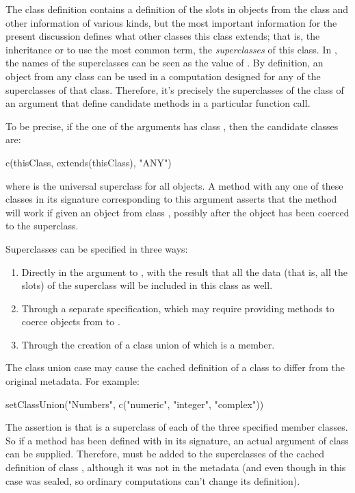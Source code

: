\documentclass[11pt]{article}
\begin{document}
The class definition contains a definition of the slots in objects from the class and other information of various kinds, but the most important information for the present discussion defines what other classes this class extends; that is, the inheritance or to use the most common term, the \emph{superclasses} of this class.
In \R{}, the names of the superclasses can be seen as the value of  .
By definition, an object from any class can be used in a computation designed for any of the superclasses of that class.
Therefore, it's precisely the superclasses of the class of an argument that define candidate methods in a particular function call.

To be precise, if the one of the arguments has class , then the candidate classes are:
\begin{Example}
c(thisClass, extends(thisClass), "ANY")
\end{Example}
where  is the universal superclass for all objects.
A method with any one of these classes in its signature  corresponding to this argument asserts that the method will work if given an object from class , possibly after the object has been coerced to the superclass.

Superclasses can be specified in three ways:
\begin{enumerate}
\item Directly in the  argument to , with the result that all the data (that is, all the slots) of the superclass will be included in this class as well.
\item  Through a separate  specification, which may require providing methods to coerce objects from  to .
\item Through the creation of a class union of which  is a member.
\end{enumerate}
The class union case may cause the cached definition of a class to differ from the original metadata.
For example:
\begin{Example}
setClassUnion("Numbers", c("numeric", "integer", "complex"))
\end{Example}
The assertion is that  is a superclass of each of the three specified member classes.
So if a method has been defined with  in its signature, an actual argument of class  can be supplied.
Therefore,  must be added to the superclasses of the cached definition of class , although it was not in the metadata (and even though in this case  was sealed, so ordinary computations can't change its definition).
\end{document}
